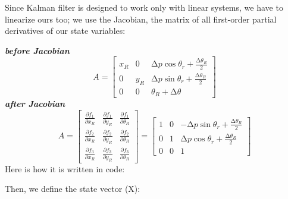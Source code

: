 Since Kalman filter is designed to work only with linear systems, we
have to linearize ours too; we use the Jacobian, the matrix of all
first-order partial derivatives of our state variables:

\textbf{\emph{before Jacobian}} \[
A = \begin{bmatrix}
x_R & 0 & ∆p\cos{\theta_r+\frac{∆\theta_R}{2}} \\
0 & y_R & ∆p\sin{\theta_r+\frac{∆\theta_R}{2}} \\
0 & 0 & \theta_R + ∆\theta
\end{bmatrix}
\] \textbf{\emph{after Jacobian}} \[
A = \begin{bmatrix}
\frac{\partial f_1}{\partial x_R} & \frac{\partial f_1}{\partial y_R} & \frac{\partial f_1}{\partial \theta_R} \\
\frac{\partial f_2}{\partial x_R} & \frac{\partial f_2}{\partial y_R} & \frac{\partial f_2}{\partial \theta_R} \\
\frac{\partial f_3}{\partial x_R} & \frac{\partial f_3}{\partial y_R} & \frac{\partial f_3}{\partial \theta_R}
\end{bmatrix} = \begin{bmatrix}
1 & 0 & -∆p\sin{\theta_r+\frac{∆\theta_R}{2}} \\
0 & 1 & ∆p\cos{\theta_r+\frac{∆\theta_R}{2}} \\
0 & 0 & 1
\end{bmatrix}
\] Here is how it is written in code:

\begin{Shaded}
\begin{Highlighting}[]
\OperatorTok{[]} \OperatorTok{=} \OperatorTok{\{}\OperatorTok{,} \OperatorTok{,} \OperatorTok{{-}}\OperatorTok{,}
              \OperatorTok{,} \OperatorTok{,}\OperatorTok{,}
              \OperatorTok{,} \OperatorTok{,} \OperatorTok{\};}
\OperatorTok{*}\OperatorTok{=} \OperatorTok{(}\OperatorTok{,}\OperatorTok{,}\OperatorTok{);}
\end{Highlighting}
\end{Shaded}

Then, we define the state vector (X):

\begin{Shaded}
\begin{Highlighting}[]
\OperatorTok{[]} \OperatorTok{=} \OperatorTok{\{}\OperatorTok{{-}\textgreater{}}\OperatorTok{,} \OperatorTok{{-}\textgreater{}}\OperatorTok{,} \OperatorTok{{-}\textgreater{}}\OperatorTok{\};}
\OperatorTok{=} \OperatorTok{(}\OperatorTok{,}\OperatorTok{,}\OperatorTok{);}
\end{Highlighting}
\end{Shaded}


